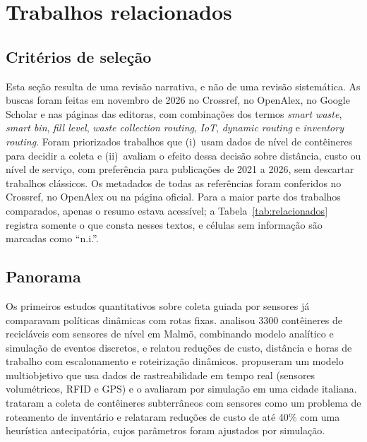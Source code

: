 \section{Trabalhos relacionados}\label{sec:relacionados}

\subsection{Critérios de seleção}

Esta seção resulta de uma revisão narrativa, e não de uma revisão sistemática.
As buscas foram feitas em novembro de 2026 no Crossref, no OpenAlex, no Google
Scholar e nas páginas das editoras, com combinações dos termos \emph{smart
waste}, \emph{smart bin}, \emph{fill level}, \emph{waste collection routing},
\emph{IoT}, \emph{dynamic routing} e \emph{inventory routing}. Foram
priorizados trabalhos que (i)~usam dados de nível de contêineres para decidir a
coleta e (ii)~avaliam o efeito dessa decisão sobre distância, custo ou nível de
serviço, com preferência para publicações de 2021 a 2026, sem descartar
trabalhos clássicos. Os metadados de todas as referências foram conferidos no
Crossref, no OpenAlex ou na página oficial. Para a maior parte dos trabalhos
comparados, apenas o resumo estava acessível; a Tabela~\ref{tab:relacionados}
registra somente o que consta nesses textos, e células sem informação são
marcadas como ``n.i.''.

\subsection{Panorama}

Os primeiros estudos quantitativos sobre coleta guiada por sensores já
comparavam políticas dinâmicas com rotas fixas. \cite{johansson2006effect}
analisou \num{3300} contêineres de recicláveis com sensores de nível em Malmö,
combinando modelo analítico e simulação de eventos discretos, e relatou
reduções de custo, distância e horas de trabalho com escalonamento e
roteirização dinâmicos. \cite{faccio2011waste} propuseram um modelo
multiobjetivo que usa dados de rastreabilidade em tempo real (sensores
volumétricos, RFID e GPS) e o avaliaram por simulação em uma cidade italiana.
\cite{mes2014inventory} trataram a coleta de contêineres subterrâneos com
sensores como um problema de roteamento de inventário e relataram reduções de
custo de até 40\% com uma heurística antecipatória, cujos parâmetros foram
ajustados por simulação.

